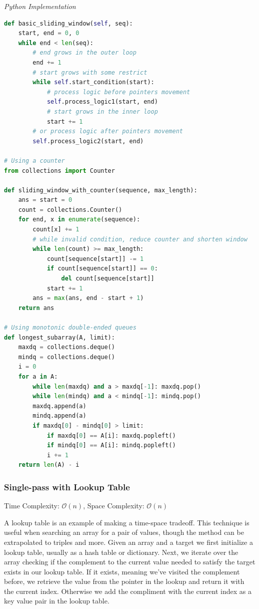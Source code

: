\documentclass{article}
\newcommand{\bigO}{\mathcal{O}}
\begin{document}
\vspace{8pt} \emph{Python Implementation}
\begin{lstlisting}[language=Python]
def basic_sliding_window(self, seq):
    start, end = 0, 0
    while end < len(seq):
        # end grows in the outer loop
        end += 1
        # start grows with some restrict
        while self.start_condition(start):
            # process logic before pointers movement
            self.process_logic1(start, end)
            # start grows in the inner loop
            start += 1
        # or process logic after pointers movement
        self.process_logic2(start, end)

# Using a counter
from collections import Counter

def sliding_window_with_counter(sequence, max_length):
    ans = start = 0
    count = collections.Counter()
    for end, x in enumerate(sequence):
        count[x] += 1
        # while invalid condition, reduce counter and shorten window 
        while len(count) >= max_length:
            count[sequence[start]] -= 1
            if count[sequence[start]] == 0:
                del count[sequence[start]]
            start += 1
        ans = max(ans, end - start + 1)
    return ans
    
# Using monotonic double-ended queues
def longest_subarray(A, limit):
    maxdq = collections.deque()
    mindq = collections.deque()
    i = 0 
    for a in A:
        while len(maxdq) and a > maxdq[-1]: maxdq.pop()
        while len(mindq) and a < mindq[-1]: mindq.pop()
        maxdq.append(a)
        mindq.append(a)
        if maxdq[0] - mindq[0] > limit:
            if maxdq[0] == A[i]: maxdq.popleft()
            if mindq[0] == A[i]: mindq.popleft()
            i += 1
    return len(A) - i
\end{lstlisting}

    \subsubsection{Single-pass with Lookup Table}
    Time Complexity: $\bigO(n)$, Space Complexity: $\bigO(n)$
    
    A lookup table is an example of making a time-space tradeoff. This technique is useful when searching an array for a pair of values, though the method can be extrapolated to triples and more. Given an array and a target we first initialize a lookup table, usually as a hash table or dictionary. Next, we iterate over the array checking if the complement to the current value needed to satisfy the target exists in our lookup table. If it exists, meaning we've visited the complement before, we retrieve the value from the pointer in the lookup and return it with the current index. Otherwise we add the compliment with the current index as a key value pair in the lookup table.
\end{document}
